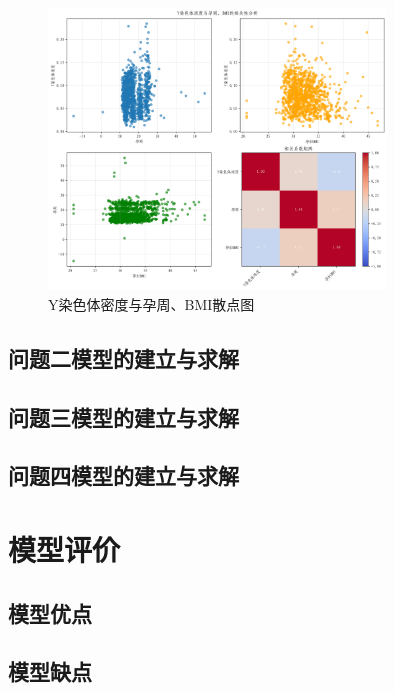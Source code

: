 \documentclass[withoutpreface,bwprint]{cumcmthesis} %
\begin{document}
\begin{figure}[H]
    \centering
    \includegraphics[width=0.8\textwidth]{../figure/q1_1.png}
    \caption{Y染色体密度与孕周、BMI散点图}
    \label{fig:q1_1}
\end{figure}







\subsection{问题二模型的建立与求解}

\subsection{问题三模型的建立与求解}

\subsection{问题四模型的建立与求解}

\section{模型评价}
\subsection{模型优点}

\subsection{模型缺点}




\begin{appendices}
\end{appendices}
\end{document}
